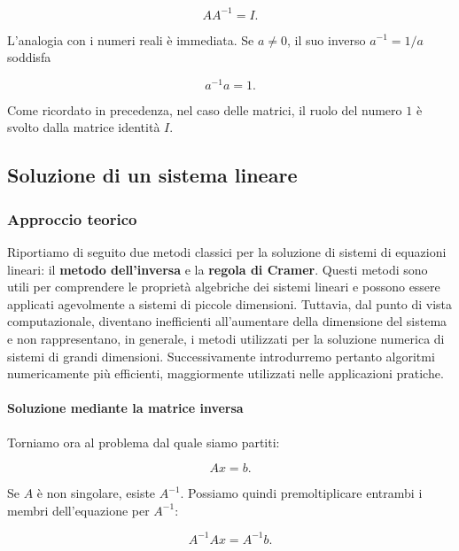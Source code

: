 \begin{equation*}
AA^{-1}=I.
\end{equation*}

L'analogia con i numeri reali è immediata. Se $a\neq0$, il suo
inverso $a^{-1}=1/a$ soddisfa

\begin{equation*}
a^{-1}a=1.
\end{equation*}

Come ricordato in precedenza, nel caso delle matrici, il ruolo del numero $1$ è svolto dalla
matrice identità $I$.


\subsection{Soluzione di un sistema lineare}

\subsubsection{Approccio teorico}
Riportiamo di seguito due metodi classici per la soluzione di sistemi di equazioni lineari: il \textbf{metodo dell'inversa} e la \textbf{regola di Cramer}. Questi metodi sono utili per comprendere le proprietà algebriche dei sistemi lineari e possono essere applicati agevolmente a sistemi di piccole dimensioni. Tuttavia, dal punto di vista computazionale, diventano inefficienti all'aumentare della dimensione del sistema e non rappresentano, in generale, i metodi utilizzati per la soluzione numerica di sistemi di grandi dimensioni. Successivamente introdurremo pertanto algoritmi numericamente più efficienti, maggiormente utilizzati nelle applicazioni pratiche.

\paragraph{Soluzione mediante la matrice inversa}

Torniamo ora al problema dal quale siamo partiti:

\begin{equation*}
Ax=b.
\end{equation*}

Se $A$ è non singolare, esiste $A^{-1}$. Possiamo quindi
premoltiplicare entrambi i membri dell'equazione per $A^{-1}$:

\begin{equation*}
A^{-1}Ax=A^{-1}b.
\end{equation*}

